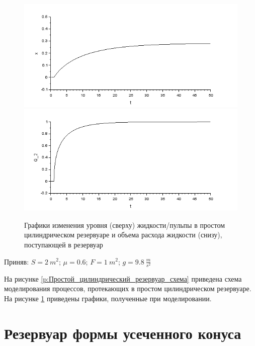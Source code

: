 \documentclass[a4paper, 12pt]{article}
\begin{document}
\begin{figure}[h!]
	\centering
	\includegraphics[scale=0.8]{graph1-1}
	\includegraphics[scale=0.8]{graph1-2}
	\caption{Графики изменения уровня (сверху) жидкости/пульпы в простом цилиндрическом резервуаре и объема расхода жидкости (снизу), поступающей в резервуар}
	\label{p:Простой_цилиндрический_резервуар_графики}
\end{figure}

Приняв:
$S = 2 \ m^2$; 
$\mu = 0.6 $;  
$F = 1 \ m^2$;  
$g = 9.8 \ \frac{m}{s^2}$ 

На рисунке \ref{p:Простой_цилиндрический_резервуар_схема} приведена схема моделирования процессов, протекающих в простом цилиндрическом резервуаре. На рисунке \ref{p:Простой_цилиндрический_резервуар_графики} приведены графики, полученные при моделировании. 

\newpage

\section{Резервуар формы усеченного конуса}
\end{document}
